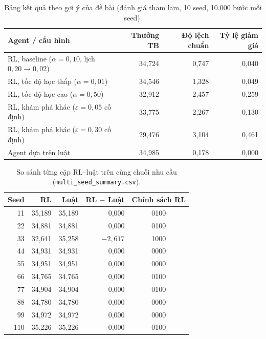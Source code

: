 \documentclass[12pt,a4paper]{report}
\begin{document}
\begin{table}[H]
\centering
\small
\caption{Bảng kết quả theo gợi ý của đề bài (đánh giá tham lam, 10 seed, 10.000 bước mỗi seed).}
\label{tab:suggested}
\begin{tabular}{lrrr}
\toprule
Agent / cấu hình & Thưởng TB & Độ lệch chuẩn & Tỷ lệ giảm giá \\
\midrule
RL, baseline ($\alpha=0{,}10$, lịch $0{,}20\to0{,}02$) & 34{,}724 & 0{,}747 & 0{,}040 \\
RL, tốc độ học thấp ($\alpha=0{,}01$) & 34{,}546 & 1{,}328 & 0{,}049 \\
RL, tốc độ học cao ($\alpha=0{,}50$) & 32{,}912 & 2{,}457 & 0{,}259 \\
RL, khám phá khác ($\varepsilon=0{,}05$ cố định) & 33{,}775 & 2{,}267 & 0{,}130 \\
RL, khám phá khác ($\varepsilon=0{,}30$ cố định) & 29{,}476 & 3{,}104 & 0{,}461 \\
Agent dựa trên luật & 34{,}985 & 0{,}178 & 0{,}000 \\
\bottomrule
\end{tabular}
\end{table}

\begin{table}[H]
\centering
\small
\caption{So sánh từng cặp RL--luật trên cùng chuỗi nhu cầu (\texttt{multi\_seed\_summary.csv}).}
\label{tab:paired}
\begin{tabular}{rrrrc}
\toprule
Seed & RL & Luật & RL $-$ Luật & Chính sách RL \\
\midrule
11 & 35{,}189 & 35{,}189 & 0{,}000 & 0100 \\
22 & 34{,}881 & 34{,}881 & 0{,}000 & 0100 \\
33 & 32{,}641 & 35{,}258 & $-2{,}617$ & 1000 \\
44 & 34{,}931 & 34{,}931 & 0{,}000 & 0000 \\
55 & 34{,}951 & 34{,}951 & 0{,}000 & 0000 \\
66 & 34{,}765 & 34{,}765 & 0{,}000 & 0100 \\
77 & 34{,}904 & 34{,}904 & 0{,}000 & 0100 \\
88 & 34{,}780 & 34{,}780 & 0{,}000 & 0000 \\
99 & 34{,}972 & 34{,}972 & 0{,}000 & 0000 \\
110 & 35{,}226 & 35{,}226 & 0{,}000 & 0100 \\
\bottomrule
\end{tabular}
\end{table}
\end{document}
